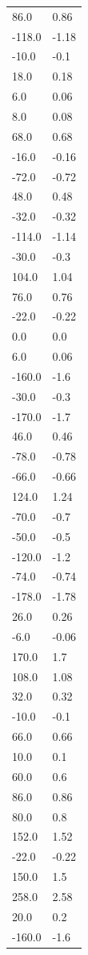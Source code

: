 \begin{longtable}{ll}
86.0 & 0.86 \\
-118.0 & -1.18 \\
-10.0 & -0.1 \\
18.0 & 0.18 \\
6.0 & 0.06 \\
8.0 & 0.08 \\
68.0 & 0.68 \\
-16.0 & -0.16 \\
-72.0 & -0.72 \\
48.0 & 0.48 \\
-32.0 & -0.32 \\
-114.0 & -1.14 \\
-30.0 & -0.3 \\
104.0 & 1.04 \\
76.0 & 0.76 \\
-22.0 & -0.22 \\
0.0 & 0.0 \\
6.0 & 0.06 \\
-160.0 & -1.6 \\
-30.0 & -0.3 \\
-170.0 & -1.7 \\
46.0 & 0.46 \\
-78.0 & -0.78 \\
-66.0 & -0.66 \\
124.0 & 1.24 \\
-70.0 & -0.7 \\
-50.0 & -0.5 \\
-120.0 & -1.2 \\
-74.0 & -0.74 \\
-178.0 & -1.78 \\
26.0 & 0.26 \\
-6.0 & -0.06 \\
170.0 & 1.7 \\
108.0 & 1.08 \\
32.0 & 0.32 \\
-10.0 & -0.1 \\
66.0 & 0.66 \\
10.0 & 0.1 \\
60.0 & 0.6 \\
86.0 & 0.86 \\
80.0 & 0.8 \\
152.0 & 1.52 \\
-22.0 & -0.22 \\
150.0 & 1.5 \\
258.0 & 2.58 \\
20.0 & 0.2 \\
-160.0 & -1.6 \\

\end{longtable}
